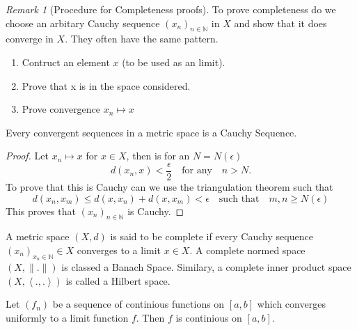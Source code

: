\documentclass{article}
\theoremstyle{remark}
\newtheorem*{remark}{Remark}
\begin{document}
\begin{remark}[Procedure for Completeness proofs]
  
  To prove completeness do we choose an arbitary Cauchy sequence $\left( x_n \right)_{n \in \mathbb{N}}$ in $X$ and show that it does converge in $X$. They often have the same pattern.

  \begin{enumerate}
    \item Contruct an element $x$ (to be used as an limit).
    \item Prove that x is in the space considered.
    \item Prove convergence $x_{n} \mapsto x$
  \end{enumerate}
\end{remark}

\begin{theorem}
  Every convergent sequences in a metric space is a Cauchy Sequence.
\end{theorem}
\begin{proof}
  Let $x_{n} \mapsto x$ for $x \in X$, then is for an $N = N\left( \epsilon \right)$\[
  d\left( x_{n},x \right) < \frac{\epsilon}{2} \quad \text{for any} \quad  n > N 
  .\] 
  To prove that this is Cauchy can we use the triangulation theorem such that \[
  d\left( x_{n}, x_{m} \right) \le d\left( x,x_{n} \right) + d\left( x, x_{m} \right) < \epsilon \quad \text{such that} \quad m,n \ge N\left( \epsilon \right)
  \]  
  This proves that $\left( x_{n} \right)_{n \in \mathbb{N}} $ is Cauchy.
  
\end{proof}

\begin{definition}
  A metric space $\left( X,d \right) $ is said to be complete if every Cauchy sequence $\left( x_n \right) _{x_{n}\in\mathbb{N}} \in X$ converges to a limit $x \in X$. A complete normed space $\left( X,\|.\| \right) $ is classed a Banach Space. Similary, a complete inner product space $\left( X, \left<.,. \right> \right) $ is called a Hilbert space. 
\end{definition}

\begin{theorem}
  Let $\left( f_n \right) $ be a sequence of continious functions on $[a,b]$ which converges uniformly to a limit function $f$. Then $f$ is continious on $[a,b]$.
\end{theorem}
\end{document}
